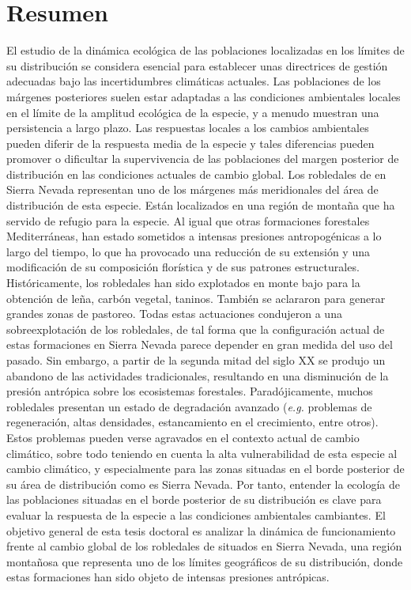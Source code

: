 %
\section*{Resumen}\label{sec:resumen}
El estudio de la dinámica ecológica de las poblaciones localizadas en los límites de su distribución se considera esencial para establecer unas directrices de gestión adecuadas bajo las incertidumbres climáticas actuales. Las poblaciones de los márgenes posteriores suelen estar adaptadas a las condiciones ambientales locales en el límite de la amplitud ecológica de la especie, y a menudo muestran una persistencia a largo plazo. Las respuestas locales a los cambios ambientales pueden diferir de la respuesta media de la especie y tales diferencias pueden promover o dificultar la supervivencia de las poblaciones del margen posterior de distribución en las condiciones actuales de cambio global. Los robledales de \Qp en Sierra Nevada representan uno de los márgenes más meridionales del  área de distribución de esta especie. Están localizados en una región de montaña que ha servido de refugio para la especie. Al igual que otras formaciones forestales Mediterráneas, han estado sometidos a intensas presiones antropogénicas a lo largo del tiempo, lo que ha provocado una reducción de su extensión y una modificación de su composición florística y de sus patrones estructurales. Históricamente, los robledales han sido explotados en monte bajo para la obtención de leña, carbón vegetal, taninos. También se aclararon para generar grandes zonas de pastoreo. Todas estas actuaciones condujeron a una sobreexplotación de los robledales, de tal forma que la configuración actual de estas formaciones en Sierra Nevada parece depender en gran medida del uso del pasado. Sin embargo, a partir de la segunda mitad del siglo XX se produjo un abandono de las actividades tradicionales, resultando en una disminución de la presión antrópica sobre los ecosistemas forestales. Paradójicamente, muchos robledales presentan un estado de degradación avanzado (\emph{e.g.} problemas de regeneración, altas densidades, estancamiento en el crecimiento, entre otros). Estos problemas pueden verse agravados en el contexto actual de cambio climático, sobre todo teniendo en cuenta la alta vulnerabilidad de esta especie al cambio climático, y especialmente para las zonas situadas en el borde posterior de su área de distribución como es Sierra Nevada. Por tanto, entender la ecología de las poblaciones situadas en el borde posterior de su distribución es clave para evaluar la respuesta de la especie a las condiciones ambientales cambiantes. El objetivo general de esta tesis doctoral es analizar la dinámica de funcionamiento frente al cambio global de los robledales de \Qp situados en Sierra Nevada, una región montañosa que representa uno de los límites geográficos de su distribución, donde estas formaciones han sido objeto de intensas presiones antrópicas. 

